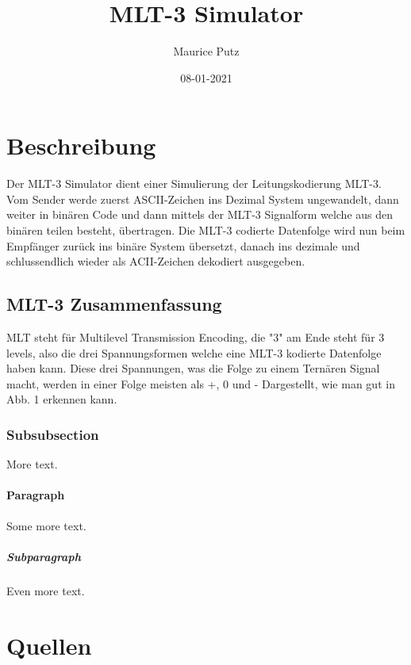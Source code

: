 \documentclass{article}
\title{MLT-3 Simulator}
\date{08-01-2021}
\author{Maurice Putz}
\begin{document}
\maketitle
{}
\newpage
{}

\section{Beschreibung}

Der MLT-3 Simulator dient einer Simulierung der Leitungskodierung MLT-3. Vom Sender werde zuerst ASCII-Zeichen 
ins Dezimal System ungewandelt, dann weiter in binären Code und dann mittels der MLT-3 Signalform welche aus
den binären teilen besteht, übertragen. Die MLT-3 codierte Datenfolge wird nun beim Empfänger zurück ins binäre System
übersetzt, danach ins dezimale und schlussendlich wieder als ACII-Zeichen dekodiert ausgegeben.

\subsection{MLT-3 Zusammenfassung}

MLT steht für Multilevel Transmission Encoding, die "3" am Ende steht für 3 levels, also die drei Spannungsformen welche eine
MLT-3 kodierte Datenfolge haben kann. Diese drei Spannungen, was die Folge zu einem Ternären Signal macht,
werden in einer Folge meisten als +, 0 und - Dargestellt, wie man gut in Abb. 1 erkennen kann.



\subsubsection{Subsubsection}

More text.

\paragraph{Paragraph}

Some more text.

\subparagraph{Subparagraph}

Even more text.

\section{Quellen}
\end{document}
